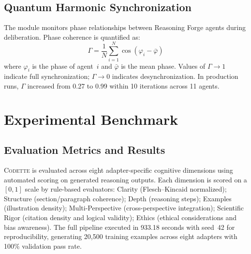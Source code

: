 \documentclass[11pt,a4paper]{article}
\newcommand{\codette}{\textsc{Codette}}
\begin{document}
\subsection{Quantum Harmonic Synchronization}
The module monitors phase relationships between Reasoning Forge agents during deliberation. Phase coherence is quantified as:
\begin{equation}
  \Gamma = \frac{1}{N} \sum_{i=1}^{N} \cos(\varphi_i - \bar{\varphi})
  \label{eq:coherence}
\end{equation}
where $\varphi_i$ is the phase of agent~$i$ and $\bar{\varphi}$ is the mean phase. Values of $\Gamma \to 1$ indicate full synchronization; $\Gamma \to 0$ indicates desynchronization. In production runs, $\Gamma$ increased from 0.27 to 0.99 within 10 iterations across 11 agents.

\section{Experimental Benchmark}
\label{sec:experiments}

\subsection{Evaluation Metrics and Results}
\codette{} is evaluated across eight adapter-specific cognitive dimensions using automated scoring on generated reasoning outputs. Each dimension is scored on a $[0, 1]$ scale by rule-based evaluators: Clarity (Flesch--Kincaid normalized); Structure (section/paragraph coherence); Depth (reasoning steps); Examples (illustration density); Multi-Perspective (cross-perspective integration); Scientific Rigor (citation density and logical validity); Ethics (ethical considerations and bias awareness). The full pipeline executed in 933.18 seconds with seed~42 for reproducibility, generating 20,500 training examples across eight adapters with 100\% validation pass rate.
\end{document}
